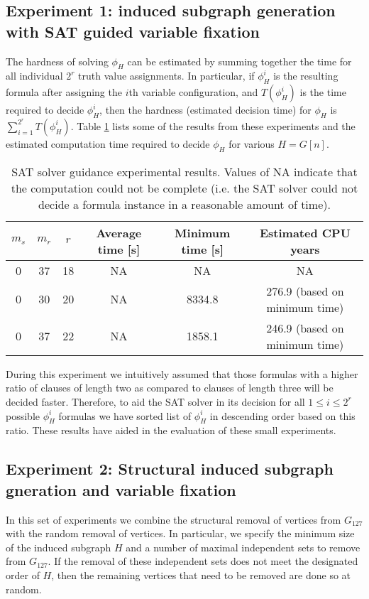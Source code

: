 \documentclass[paper=a4, fontsize=11pt]{scrartcl} %
\begin{document}
\subsection{Experiment 1: induced subgraph generation with SAT guided variable fixation}
The hardness of solving $\phi_H$ can be estimated by summing together the time for
all individual $2^r$ truth value assignments. In particular, if $\phi_H^i$ is the
resulting formula after assigning the $i$th variable configuration, and $T(\phi_H^i)$ 
is the time required to decide $\phi_H^i$, then the hardness (estimated decision time)
for $\phi_H$ is $\sum_{i = 1}^{2^r} T(\phi_H^i)$. Table \ref{tab:guidanceExperiment}
lists some of the results from these experiments and the estimated computation time
required to decide $\phi_H$ for various $H = G[n]$.

\begin{table}
	\caption{SAT solver guidance experimental results. Values of NA indicate that the computation
	could not be complete (i.e. the SAT solver could not decide a formula instance in a reasonable
	amount of time).}
	\begin{tabular}{c | c | c | c | c | c}
		\hline
		$m_s$ & $m_r$ & $r$ & Average time [s] & Minimum time [s] & Estimated CPU years\\ \hline
		0 & 37 & 18 & NA & NA & NA\\ \hline
		0 & 30 & 20 & NA & 8334.8 & 276.9 (based on minimum time) \\ \hline
		0 & 37 & 22 & NA & 1858.1 & 246.9 (based on minimum time) \\
		\hline
	\end{tabular}
	\label{tab:guidanceExperiment}
\end{table}

During this experiment we intuitively assumed that those formulas with a 
higher ratio of clauses of length two as compared to clauses of length 
three will be decided faster. Therefore, to aid the SAT solver in its
decision for all $1 \leq i \leq 2^{r}$ possible $\phi_H^i$ formulas
we have sorted list of $\phi_H^i$ in descending order based on this ratio. 
These results have aided in the evaluation of these small experiments. 


\subsection{Experiment 2: Structural induced subgraph gneration and variable fixation}
In this set of experiments we combine the structural removal of vertices from $G_{127}$
with the random removal of vertices. In particular, we specify the minimum size of 
the induced subgraph $H$ and a number of maximal independent sets to remove from $G_{127}$.
If the removal of these independent sets does not meet the designated order of $H$,
then the remaining vertices that need to be removed are done so at random. 
\end{document}
